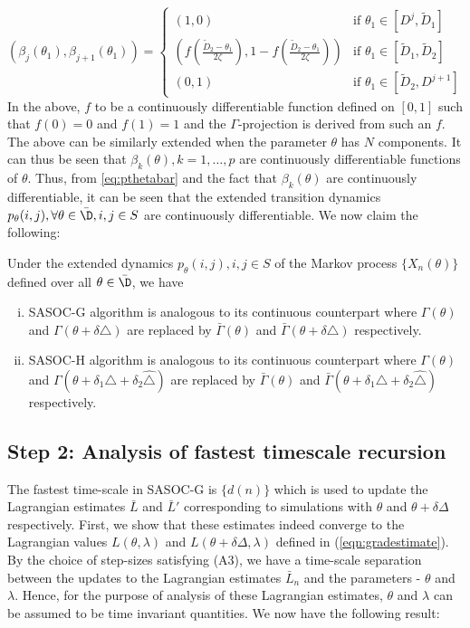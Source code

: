 \documentclass[11pt,letterpaper,english]{article}
\begin{document}
\begin{equation}
 (\beta_j(\theta_1),\beta_{j+1}(\theta_1)) =
  \begin{cases}
   (1,0) &  \text{if } \theta_1 \in\left[D^j,\tilde D_1 \right] \\
   (f(\frac{\tilde D_2 - \theta_1}{2\zeta}), 1- f(\frac{\tilde D_2 - \theta_1}{2\zeta})) & \text{if } \theta_1 \in \left[\tilde D_1, \tilde D_2\right]  \\
   (0,1) & \text{if } \theta_1 \in \left[\tilde D_2,D^{j+1}\right]
  \end{cases}
\end{equation}
In the above, $f$ to be a continuously differentiable function defined on $[0,1]$ such that $f(0)=0$ and $f(1)=1$ and the $\Gamma$-projection is derived from such an $f$. The above can be similarly extended when the parameter $\theta$ has $N$ components. It can thus be seen that $\beta_k(\theta), k=1,\ldots,p$ are continuously differentiable functions of $\theta$. Thus, from  \eqref{eq:pthetabar} and the fact that $\beta_k(\theta)$ are continuously differentiable, it can be seen that the extended transition dynamics $p_\theta(i,j), \forall \theta \in \bar\D, i,j \in S$ are continuously differentiable.
We now claim the following:
\begin{lemma}
\label{lemma:sasocequivalence}
Under the extended dynamics $p_\theta(i,j),i,j \in S$ of the Markov process
$\{X_n(\theta)\}$ defined over all $\theta \in \bar \D$, we have
\begin{enumerate}[(i)]
    \item SASOC-G algorithm is analogous to its continuous counterpart where $\Gamma(\theta)$ and $\Gamma(\theta + \delta \triangle)$ are replaced by $\bar\Gamma(\theta)$ and $\bar\Gamma(\theta + \delta \triangle)$ respectively.
    \item SASOC-H algorithm is analogous to its continuous counterpart
where $\Gamma(\theta)$ and $\Gamma(\theta + \delta_1 \triangle + \delta_2
\hat\triangle)$ are replaced by $\bar\Gamma(\theta)$ and $\bar\Gamma(\theta
+\delta_1 \triangle + \delta_2 \hat\triangle)$ respectively.
\end{enumerate}
\end{lemma}

\subsection*{Step 2: Analysis of fastest timescale recursion}
The fastest time-scale in SASOC-G is $\{d(n)\}$ which is used
to update the Lagrangian estimates $\bar{L}$ and $\bar{L}'$ corresponding to
simulations with $\theta$ and $\theta + \delta \Delta$ respectively. First, we
show that these estimates indeed converge to the Lagrangian values $L(\theta,
\lambda)$ and $L(\theta + \delta \Delta, \lambda)$ defined in
(\ref{eqn:gradestimate}). By the choice of
step-sizes satisfying (A3), we have a time-scale separation between the updates
to the Lagrangian estimates $\bar{L}_n$ and the parameters - $\theta$ and
$\lambda$. Hence, for the purpose of analysis of these
Lagrangian estimates, $\theta$ and $\lambda$ can be
assumed to be time invariant quantities. We now have the following result:
\end{document}
